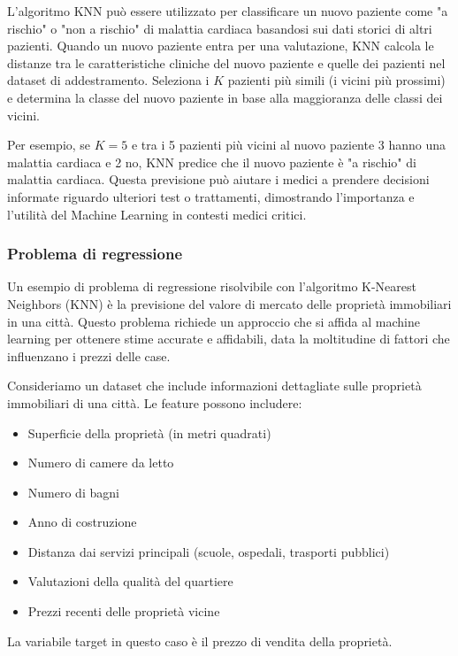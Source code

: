 L'algoritmo KNN può essere utilizzato per classificare un nuovo paziente come "a rischio" o "non a rischio" di malattia cardiaca basandosi sui dati storici di altri pazienti. Quando un nuovo paziente entra per una valutazione, KNN calcola le distanze tra le caratteristiche cliniche del nuovo paziente e quelle dei pazienti nel dataset di addestramento. Seleziona i \( K \) pazienti più simili (i vicini più prossimi) e determina la classe del nuovo paziente in base alla maggioranza delle classi dei vicini.

Per esempio, se \( K = 5 \) e tra i 5 pazienti più vicini al nuovo paziente 3 hanno una malattia cardiaca e 2 no, KNN predice che il nuovo paziente è "a rischio" di malattia cardiaca. Questa previsione può aiutare i medici a prendere decisioni informate riguardo ulteriori test o trattamenti, dimostrando l'importanza e l'utilità del Machine Learning in contesti medici critici.

\subsubsection{Problema di regressione}

Un esempio di problema di regressione risolvibile con l'algoritmo K-Nearest Neighbors (KNN) è la previsione del valore di mercato delle proprietà immobiliari in una città. Questo problema richiede un approccio che si affida al machine learning per ottenere stime accurate e affidabili, data la moltitudine di fattori che influenzano i prezzi delle case.

Consideriamo un dataset che include informazioni dettagliate sulle proprietà immobiliari di una città. Le feature possono includere:

\begin{itemize}
    \item Superficie della proprietà (in metri quadrati)
    \item Numero di camere da letto
    \item Numero di bagni
    \item Anno di costruzione
    \item Distanza dai servizi principali (scuole, ospedali, trasporti pubblici)
    \item Valutazioni della qualità del quartiere
    \item Prezzi recenti delle proprietà vicine
\end{itemize}

La variabile target in questo caso è il prezzo di vendita della proprietà.

